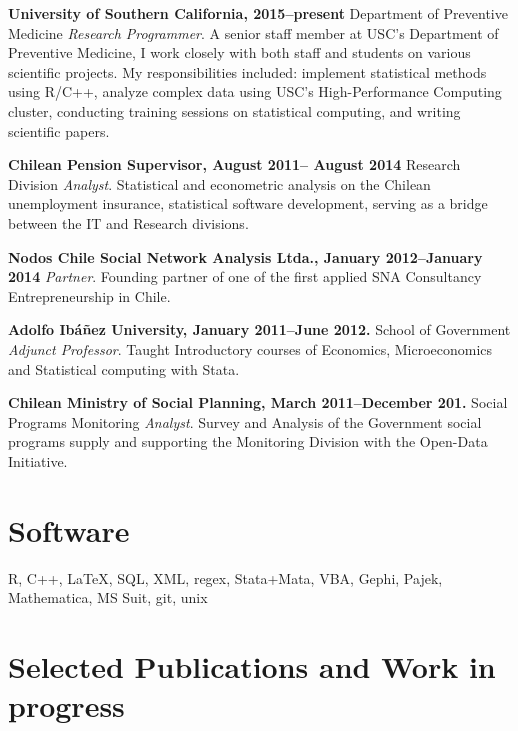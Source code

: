 \documentclass[letterpaper, 11pt]{article}
\renewenvironment{itemize}{
  \begin{list}{}{
    \setlength{\leftmargin}{0.45cm}
  }
}{
  \end{list}
}
\begin{document}
\begin{itemize}
\item \textbf{University of Southern California, 2015--present} Department of Preventive Medicine \emph{Research Programmer}. A senior staff member at USC's Department of Preventive Medicine, I work closely with both staff and students on various scientific projects. My responsibilities included: implement statistical methods using R/C++, analyze complex data using USC's High-Performance Computing cluster, conducting training sessions on statistical computing, and writing scientific papers.
\item \textbf{Chilean Pension Supervisor, August 2011-- August 2014} Research Division \emph{Analyst}. Statistical and econometric analysis on the Chilean unemployment insurance, statistical software development, serving as a bridge between the IT and Research divisions.
\item \textbf{Nodos Chile Social Network Analysis Ltda., January 2012--January 2014} \emph{Partner}.
Founding partner of one of the first applied SNA Consultancy Entrepreneurship in Chile.
\item \textbf{Adolfo Ib\'a\~nez University, January 2011--June 2012.} School of Government \emph{Adjunct Professor}.
Taught Introductory courses of Economics, Microeconomics and Statistical computing with Stata.
\item \textbf{Chilean Ministry of Social Planning, March 2011--December 201.} Social Programs Monitoring \emph{Analyst}.
Survey and Analysis of the Government social programs supply and supporting the Monitoring Division with the Open-Data Initiative.
\end{itemize}

\section*{Software}

\begin{itemize}
\item[] R, C++, \LaTeX, SQL, XML, regex, Stata+Mata, VBA, Gephi, Pajek, Mathematica, MS Suit, git, unix
\end{itemize}

\section*{Selected Publications and Work in progress}

\nocite{VegaYon2019a,VegaYon2019b,VegaYon2019c,Bell2019,DelaHaye2019,Valente2020,Valente2019,FabregaLacoa2013,vega2015rgexf,vega2019exponential,vega2013abcoptim,vega2020ergmito,vegayon2020aphylo}
\end{document}
